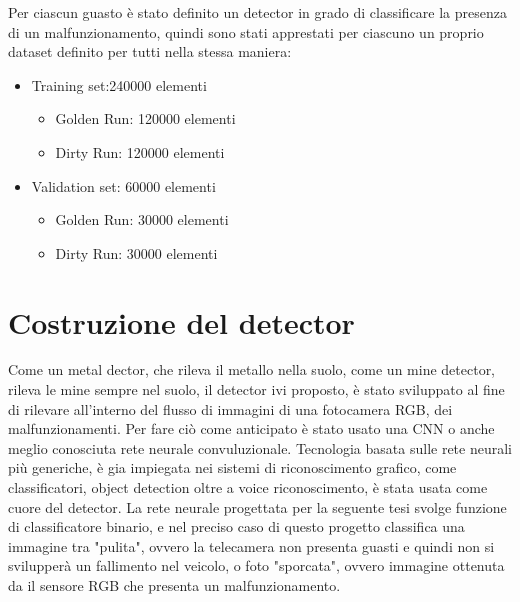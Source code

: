 \documentclass[14pt]{extarticle}
\begin{document}
Per ciascun guasto è stato definito un detector in grado di classificare la presenza di un malfunzionamento, quindi sono stati apprestati per ciascuno un proprio dataset definito per tutti nella stessa maniera:
\begin{itemize}
\item Training set:240000 elementi
\begin{itemize}
\item Golden Run: 120000 elementi
\item Dirty Run: 120000 elementi
\end{itemize}
\item Validation set: 60000 elementi
\begin{itemize}
\item Golden Run: 30000 elementi
\item Dirty Run: 30000 elementi
\end{itemize}
\end{itemize}


\section{Costruzione del detector}
Come un metal dector, che rileva il metallo nella suolo, come un mine detector, rileva le mine sempre nel suolo, il detector ivi proposto, è stato sviluppato al fine di rilevare all'interno del flusso di immagini di una fotocamera RGB, dei malfunzionamenti.
Per fare ciò come anticipato è stato usato una CNN o anche meglio conosciuta  rete neurale convuluzionale.
Tecnologia basata sulle rete neurali più generiche, è gia impiegata nei sistemi di riconoscimento grafico, come classificatori, object detection oltre a voice riconoscimento, è stata usata come cuore del detector. 
La rete neurale progettata per la seguente tesi svolge funzione di classificatore binario, e nel preciso caso di questo progetto classifica una immagine tra "pulita", ovvero la telecamera non presenta guasti e quindi non si svilupperà un fallimento nel veicolo,  o foto "sporcata", ovvero immagine ottenuta da il sensore RGB che presenta un malfunzionamento.
\end{document}
